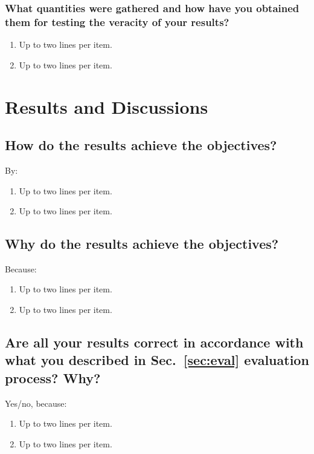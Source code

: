 \subsubsection{What quantities were gathered and how have you obtained them for testing the veracity of your results?}
\begin{enumerate}
\item Up to two lines per item.
\item Up to two lines per item.
\end{enumerate}




















\section{Results and Discussions}

\subsection{How do the results achieve the objectives?}
By:
\begin{enumerate}
\item Up to two lines per item.
\item Up to two lines per item.
\end{enumerate}
	
\subsection{Why do the results achieve the objectives?}
Because:
\begin{enumerate}
\item Up to two lines per item.
\item Up to two lines per item.
\end{enumerate}

\subsection{Are all your results correct in accordance with what you described in Sec.~\ref{sec:eval} evaluation process? Why?} 
Yes/no, because:
\begin{enumerate}
\item Up to two lines per item.
\item Up to two lines per item.
\end{enumerate}
	
